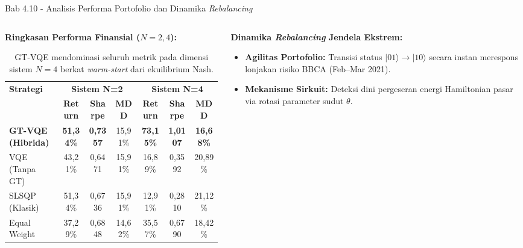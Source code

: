 \begin{frame}{Bab 4.10 - Analisis Performa Portofolio dan Dinamika \textit{Rebalancing}}
    \begin{columns}[T]
        \begin{column}{0.53\textwidth}
            \textbf{Ringkasan Performa Finansial ($N=2, 4$):}
            \begin{table}
                \tiny
                \centering
                \begin{tabular}{|l|c|c|c|c|c|c|}
                \hline
                \multirow{2}{*}{\textbf{Strategi}} & \multicolumn{3}{c|}{\textbf{Sistem N=2}} & \multicolumn{3}{c|}{\textbf{Sistem N=4}} \\ \cline{2-7} 
                 & \textbf{Return} & \textbf{Sharpe} & \textbf{MDD} & \textbf{Return} & \textbf{Sharpe} & \textbf{MDD} \\ \hline
                \textbf{GT-VQE (Hibrida)} & \textbf{51,34\%} & \textbf{0,7357} & 15,91\% & \textbf{73,15\%} & \textbf{1,0107} & \textbf{16,68\%} \\ \hline
                VQE (Tanpa GT) & 43,21\% & 0,6471 & 15,91\% & 16,89\% & 0,3592 & 20,89\% \\ \hline
                SLSQP (Klasik) & 51,34\% & 0,6736 & 15,91\% & 12,91\% & 0,2810 & 21,12\% \\ \hline
                Equal Weight & 37,29\% & 0,6848 & 14,62\% & 35,57\% & 0,6790 & 18,42\% \\ \hline
                \end{tabular}
                \caption{GT-VQE mendominasi seluruh metrik pada dimensi sistem $N=4$ berkat \textit{warm-start} dari ekuilibrium Nash.}
            \end{table}
        \end{column}
        \hfill
        \begin{column}{0.45\textwidth}
            \textbf{Dinamika \textit{Rebalancing} Jendela Ekstrem:}
            \begin{itemize}
                \item \textbf{Agilitas Portofolio:} Transisi status $|01\rangle \to |10\rangle$ secara instan merespons lonjakan risiko BBCA (Feb--Mar 2021).
                \item \textbf{Mekanisme Sirkuit:} Deteksi dini pergeseran energi Hamiltonian pasar via rotasi parameter sudut $\theta$.
            \end{itemize}

\end{column}
\end{columns}
\end{frame}
